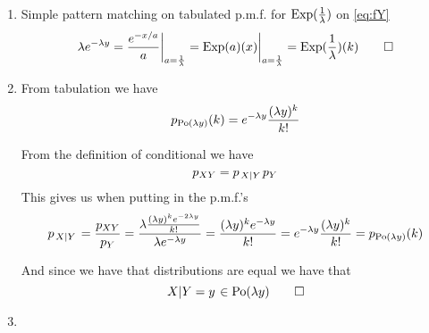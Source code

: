 \documentclass[a4paper,twoside=false,abstract=false,numbers=noenddot,
titlepage=false,headings=small,parskip=half,version=last]{scrartcl}
\begin{document}
\begin{solution}
\begin{enumerate}
        \item Simple pattern matching on tabulated p.m.f. for
            $\text{Exp}(\frac{1}{\lambda})$ on \eqref{eq:fY}
            \begin{equation}
                \lambda e^{-\lambda y} =
                {
                    \frac{
                        e^{-x/a}
                    }{
                        a
                    }
                }\bigg|_{
                    a=\frac{1}{\lambda}
                } =
                {\text{Exp}(a)(x)}\bigg|_{a=\frac{1}{\lambda}} =
                \text{Exp}(\frac{1}{\lambda})(k) \qed
            \end{equation}

        \item From tabulation we have
            \begin{equation}
                \label{eq:podef}
                p_{\text{Po}(\lambda y)}(k) = e^{-\lambda y} \frac{(\lambda
                y)^k}{k!}
            \end{equation}

            From the definition of conditional we have
            \begin{equation}
                p_{XY} = p_{\left. X \middle\vert Y \right.}p_{Y}
            \end{equation}
            This gives us when putting in the p.m.f.'s
            \begin{equation}
                p_{\left. X \middle\vert Y \right.} =
                \frac{p_{XY}}{p_{Y}} =
                \frac{
                    \lambda \frac{
                        (\lambda y)^ke^{-2\lambda y}
                    }{
                        k!
                    }
                }{
                    \lambda e^{-\lambda y}
                } =
                \frac{
                    (\lambda y)^k e^{-\lambda y}
                }{
                    k!
                } = e^{-\lambda y} \frac{(\lambda
                    y)^k}{k!} = 
                    p_{
                    \text{Po}(\lambda y)}(k) 
            \end{equation}

            And since we have that distributions are equal we have that
            \begin{equation}
                \left. X \middle\vert Y=y \right. \in \text{Po}(\lambda y) \qed
            \end{equation}

        \item

    \end{enumerate}
\end{solution}
\pagebreak
\end{document}
